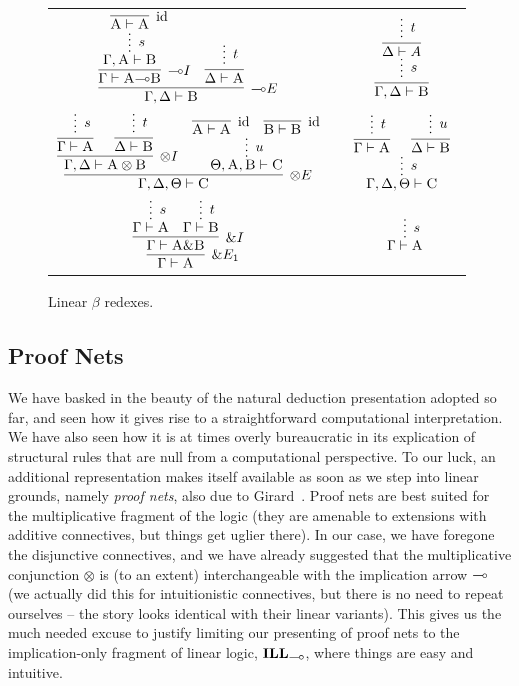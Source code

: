 \begin{figure}
	\centering
	\begin{tabularx}{0.95\textwidth}{@{}ccc@{}}
	$\infer[\li E]{\Gamma, \Delta \vdash \prop{B}}{
	\infer[\li I]{\Gamma \vdash \prop{A} \li \prop{B}}{
		\infer*[s]{\Gamma, \prop{A} \vdash \prop{B}}{
				\infer[\Ax]{\prop{A} \vdash \prop{A}}{} 
			}
		}
		&
		\infer{\Delta \vdash \prop{A}}{
			\infer*[t]{}{}
		}
	}$
	&
	\raisebox{20pt}{$\implies$}
	&
	$ 
	\infer[]{\Gamma, \Delta \vdash \prop{B}}{
		\infer*[s]{}{
		\infer[]{\Delta \vdash A}{
			\infer*[t]{}{}
		}}
	}
	$\\[\smallsep]
	$
	\infer[\otimes E]{\Gamma, \Delta, \Theta \vdash \prop{C}}{
		\infer[\otimes I]{\Gamma, \Delta \vdash \prop{A} \otimes \prop{B}}{
			\infer[]{\Gamma \vdash \prop{A}}{\infer*[s]{}{}}
			&
			\infer[]{\Delta \vdash \prop{B}}{\infer*[t]{}{}}
		}		
		&
		\infer*[u]{\Theta, \prop{A}, \prop{B} \vdash \prop{C}}{
			\infer[\Ax]{\prop{A} \vdash \prop{A}}{}
			& 
			\infer[\Ax]{\prop{B} \vdash \prop{B}}{}
		}
	}
	$
	&
	\raisebox{20pt}{$\implies$}
	&
	$
	\infer*[s]{\Gamma, \Delta, \Theta \vdash \prop{C}}{
		\infer[]{\Gamma \vdash \prop{A}}{
			\infer*[t]{}{}
		}
		&
		\infer[]{\Delta \vdash \prop{B}}{
			\infer*[u]{}{}
		}
	}
	$\\[\smallsep]
	$
	\infer[\with E_1]{\Gamma \vdash \prop{A}}{
		\infer[\with I]{\Gamma \vdash \prop{A} \with \prop{B}}{
			\infer*[s]{\Gamma \vdash \prop{A}}{}
			&
			\infer*[t]{\Gamma \vdash \prop{B}}{}
		}
	}
	$
	&
	\raisebox{10pt}{$\implies$}
	&
	$
	\infer*[s]{\Gamma \vdash \prop{A}}{}
	$
	\end{tabularx}
	\caption{Linear $\beta$ redexes.}
	\label{figure:linear_proof_reductions}
\end{figure}


\subsection{Proof Nets}
We have basked in the beauty of the natural deduction presentation adopted so far, and seen how it gives rise to a straightforward computational interpretation.
We have also seen how it is at times overly bureaucratic in its explication of structural rules that are null from a computational perspective.
To our luck, an additional representation makes itself available as soon as we step into linear grounds, namely \textit{proof nets}, also due to Girard~\cite{girard1987linear}. 
Proof nets are best suited for the multiplicative fragment of the logic (they are amenable to extensions with additive connectives, but things get uglier there).
In our case, we have foregone the disjunctive connectives, and we have already suggested that the multiplicative conjunction $\otimes$ is (to an extent) interchangeable with the implication arrow $\li$ (we actually did this for intuitionistic connectives, but there is no need to repeat ourselves -- the story looks identical with their linear variants).
This gives us the much needed excuse to justify limiting our presenting of proof nets to the implication-only fragment of linear logic, $\ILL_{\li}$, where things are easy and intuitive.

